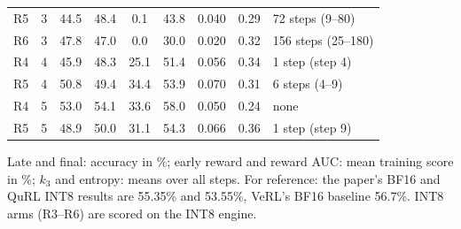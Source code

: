 \documentclass[11pt]{article}
\begin{document}
\begin{table}[tbp]
\begin{tabularx}{\linewidth}{@{}l c c c c c c c L@{}}
R5 & 3 & 44.5 & 48.4 & 0.1 & 43.8 & 0.040 & 0.29 & 72 steps (9--80)\\
R6 & 3 & 47.8 & 47.0 & 0.0 & 30.0 & 0.020 & 0.32 & 156 steps (25--180)\\
\midrule
R4 & 4 & 45.9 & 48.3 & 25.1 & 51.4 & 0.056 & 0.34 & 1 step (step 4)\\
R5 & 4 & 50.8 & 49.4 & 34.4 & 53.9 & 0.070 & 0.31 & 6 steps (4--9)\\
\midrule
R4 & 5 & 53.0 & 54.1 & 33.6 & 58.0 & 0.050 & 0.24 & none\\
R5 & 5 & 48.9 & 50.0 & 31.1 & 54.3 & 0.066 & 0.36 & 1 step (step 9)\\
\bottomrule
\end{tabularx}

\smallskip\raggedright
Late and final: accuracy in \%; early reward and reward AUC: mean training score in \%; $k_3$ and entropy: means over all steps. For reference: the paper's BF16 and QuRL INT8 results are 55.35\% and 53.55\%, VeRL's BF16 baseline 56.7\%. INT8 arms (R3--R6) are scored on the INT8 engine.
\end{table}
\end{document}
